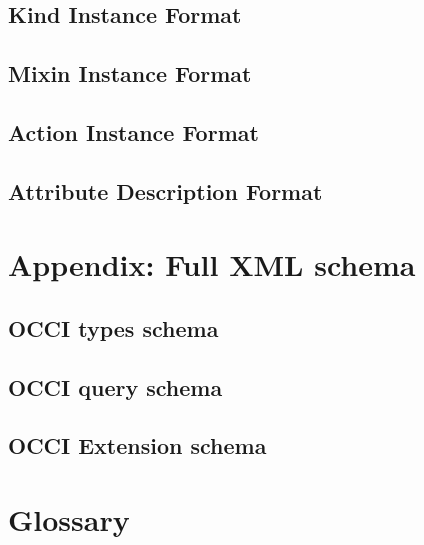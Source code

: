 \documentclass[10pt,a4paper]{article}
\begin{document}
\subsection{Kind Instance Format}
\label{sec:format_kind}

\subsection{Mixin Instance Format}
\label{sec:format_mixin}

\subsection{Action Instance Format}
\label{sec:format_action}

\subsection{Attribute Description Format}
\label{sec:format_attribute_description}

\section{Appendix: Full XML schema}
\label{sec:full_xml_schema}

\subsection{OCCI types schema}
\label{sec:occi_types_schema}



\subsection{OCCI query schema}
\label{sec:occi_query_schema}



\subsection{OCCI Extension schema}
\label{sec:occi_extension_schema}



\section{Glossary}
\label{sec:glossary}

\end{document}
